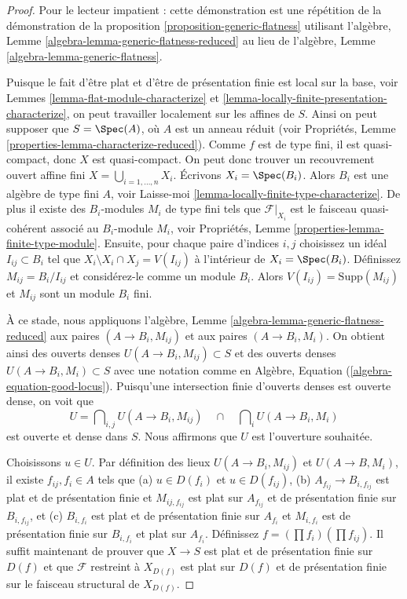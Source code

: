 \begin{proof}
Pour le lecteur impatient : cette démonstration est une
répétition de la démonstration de la
proposition
\ref{proposition-generic-flatness} utilisant l'algèbre, Lemme \ref{algebra-lemma-generic-flatness-reduced}
au
lieu de l'algèbre, Lemme \ref{algebra-lemma-generic-flatness}.

\medskip\noindent
Puisque le fait d'être plat et d'être de présentation finie est
local
sur la base, voir Lemmes \ref{lemma-flat-module-characterize} et \ref{lemma-locally-finite-presentation-characterize},
on peut travailler localement sur les affines
de $S$. Ainsi on peut supposer que $S = \Spec(A)$,
où $A$ est un anneau réduit (voir Propriétés,
Lemme \ref{properties-lemma-characterize-reduced}). Comme $f$ est de type fini,
il est quasi-compact, donc $X$ est quasi-compact. On peut
donc trouver un recouvrement ouvert affine
fini $X = \bigcup_{i = 1, \ldots, n} X_i$. Écrivons $X_i = \Spec(B_i)$. Alors $B_i$ est une
algèbre de type fini $A$, voir
Laisse-moi \ref{lemma-locally-finite-type-characterize}. De plus il existe des
$B_i$-modules $M_i$
de type fini tels que $\mathcal{F}|_{X_i}$ est le faisceau
quasi-cohérent associé au $B_i$-module $M_i$,
voir Propriétés, Lemme \ref{properties-lemma-finite-type-module}. Ensuite, pour
chaque paire d'indices $i, j$ choisissez un idéal $I_{ij} \subset B_i$
tel que $X_i \setminus X_i \cap X_j = V(I_{ij})$ à l'intérieur de $X_i = \Spec(B_i)$.
Définissez $M_{ij} = B_i/I_{ij}$ et considérez-le comme
un module $B_i$. Alors $V(I_{ij}) = \text{Supp}(M_{ij})$ et $M_{ij}$
sont un module $B_i$ fini.

\medskip\noindent
À ce stade, nous
appliquons l'algèbre, Lemme \ref{algebra-lemma-generic-flatness-reduced} aux paires
$(A \to B_i, M_{ij})$ et aux paires $(A \to B_i, M_i)$. On obtient ainsi
des ouverts denses $U(A \to B_i, M_{ij}) \subset S$
et des ouverts denses $U(A \to B_i, M_i) \subset S$
avec une notation comme en Algèbre, Equation
(\ref{algebra-equation-good-locus}). Puisqu’une intersection
finie d’ouverts denses est ouverte dense, on voit que
$$
U =
\bigcap\nolimits_{i, j} U(A \to B_i, M_{ij})
\quad\cap\quad
\bigcap\nolimits_i U(A \to B_i, M_i)
$$
est ouverte et dense dans $S$. Nous affirmons que $U$ est l'ouverture souhaitée.

\medskip\noindent
Choisissons $u \in U$. Par définition des lieux $U(A \to B_i, M_{ij})$
et $U(A \to B, M_i)$, il existe $f_{ij}, f_i \in A$ tels que (a)
$u \in D(f_i)$ et $u \in D(f_{ij})$, (b) $A_{f_{ij}} \to B_{i, f_{ij}}$
est plat et de présentation finie et $M_{ij, f_{ij}}$ est plat
sur $A_{f_{ij}}$ et de présentation finie sur $B_{i, f_{ij}}$, et (c)
$B_{i, f_i}$ est plat
et de présentation finie sur $A_{f_i}$ et $M_{i, f_i}$ est de
présentation finie sur $B_{i, f_i}$ et plat sur $A_{f_i}$.
Définissez $f = (\prod f_i) (\prod f_{ij})$.
Il suffit maintenant
de prouver que $X \to S$ est plat et de présentation finie
sur $D(f)$ et que $\mathcal{F}$ restreint à $X_{D(f)}$ est plat
sur $D(f)$ et de présentation finie sur le faisceau structural de
$X_{D(f)}$.


\end{proof}
